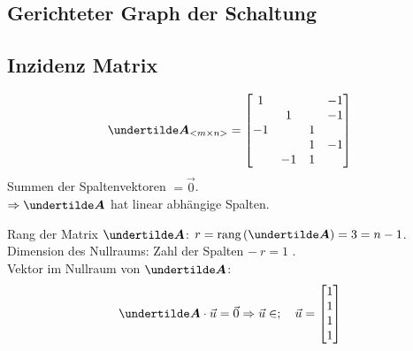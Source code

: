 \subsection{Gerichteter Graph der Schaltung}

\subsection{Inzidenz Matrix}
\begin{align*}
\ma{A}_{<m\times n>} = \begin{bmatrix}
1 & & & -1\\
 & 1 & & -1\\
-1 & & 1 & \\
 & & 1 & -1\\
 & -1 & 1 & 
\end{bmatrix}
\end{align*}
Summen der Spaltenvektoren $= \vec{0}$.\\
$\Rightarrow \ma{A}$ hat linear abhängige Spalten.

Rang der Matrix $\ma{A}$: $r = \rang{\ma{A}} = 3 = n-1$.\\
Dimension des Nullraums: Zahl der Spalten $-\ r = 1$ .\\
Vektor im Nullraum von $\ma{A}$:
\begin{align*}
\ma{A}\cdot\vec{u}=\vec{0}\Rightarrow\vec{u}\in ;\quad\vec{u}=\begin{bmatrix}1\\1\\1\\1\end{bmatrix}
\end{align*}

